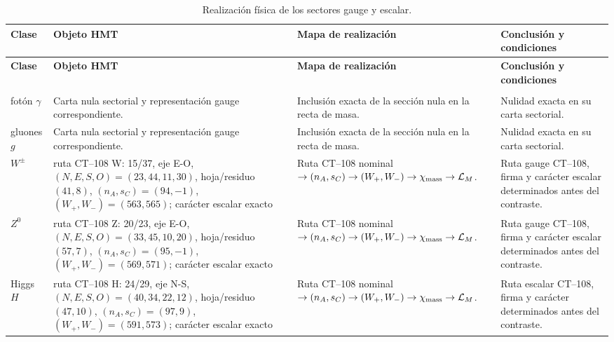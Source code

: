 \begingroup
\setlength{\tabcolsep}{4.5pt}
\renewcommand{\arraystretch}{1.28}
\begin{longtable}{@{}>{\raggedright\arraybackslash}p{}>{\raggedright\arraybackslash}p{}>{\raggedright\arraybackslash}p{}>{\raggedright\arraybackslash}p{}@{}}
\caption{Realización física de los sectores gauge y escalar.}\label{tab:masas-realizacion-gauge-escalar}\\
\toprule
\textbf{Clase} & \textbf{Objeto HMT} & \textbf{Mapa de realización} & \textbf{Conclusión y condiciones} \\
\midrule
\endfirsthead
\toprule
\textbf{Clase} & \textbf{Objeto HMT} & \textbf{Mapa de realización} & \textbf{Conclusión y condiciones} \\
\midrule
\endhead
\midrule
\multicolumn{4}{r}{\footnotesize Continúa en la página siguiente.}\\
\endfoot
\bottomrule
\endlastfoot
fotón $\gamma$ & Carta nula sectorial y representación gauge correspondiente. & Inclusión exacta de la sección nula en la recta de masa. & Nulidad exacta en su carta sectorial. \\
gluones $g$ & Carta nula sectorial y representación gauge correspondiente. & Inclusión exacta de la sección nula en la recta de masa. & Nulidad exacta en su carta sectorial. \\
$W^\pm$ & ruta CT--108 W: 15/37, eje E-O, $(N,E,S,O)=(23,44,11,30)$, hoja/residuo $(41,8)$, $(n_A,s_C)=(94,-1)$, $(W_+,W_-)=(563,565)$; carácter escalar exacto & Ruta CT--108 nominal $\to(n_A,s_C)\to(W_+,W_-)\to\chi_{\rm mass}\to\mathcal L_M$. & Ruta gauge CT--108, firma y carácter escalar determinados antes del contraste. \\
$Z^0$ & ruta CT--108 Z: 20/23, eje E-O, $(N,E,S,O)=(33,45,10,20)$, hoja/residuo $(57,7)$, $(n_A,s_C)=(95,-1)$, $(W_+,W_-)=(569,571)$; carácter escalar exacto & Ruta CT--108 nominal $\to(n_A,s_C)\to(W_+,W_-)\to\chi_{\rm mass}\to\mathcal L_M$. & Ruta gauge CT--108, firma y carácter escalar determinados antes del contraste. \\
Higgs $H$ & ruta CT--108 H: 24/29, eje N-S, $(N,E,S,O)=(40,34,22,12)$, hoja/residuo $(47,10)$, $(n_A,s_C)=(97,9)$, $(W_+,W_-)=(591,573)$; carácter escalar exacto & Ruta CT--108 nominal $\to(n_A,s_C)\to(W_+,W_-)\to\chi_{\rm mass}\to\mathcal L_M$. & Ruta escalar CT--108, firma y carácter determinados antes del contraste. \\
\end{longtable}
\endgroup
